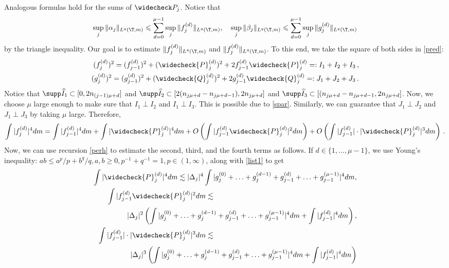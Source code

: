 \documentclass[twoside,a4paper]{amsart}
\def\ge{\geqslant}
\def\le{\leqslant}
\theoremstyle{remark}
\numberwithin{equation}{section}
\begin{document}
 Analogous formulas hold for the sums of $\widecheck P_j$. Notice that
 \begin{equation}\label{triangle}
 \sup_{j}\|\alpha_j\|_{L^q(\T,m)}\le \sum_{d=0}^{\mu-1}\sup_j\|f_j^{(d)}\|_{L^q(\T,m)}, \quad \sup_{j}\|\beta_j\|_{L^q(\T,m)}\le \sum_{d=0}^{\mu-1}\sup_j\|g_j^{(d)}\|_{L^q(\T,m)}
 \end{equation}
 by the triangle inequality. Our goal is to estimate $\|f_j^{(d)}\|_{L^4(\T,m)}$ and $\|f_j^{(d)}\|_{L^4(\T,m)}$.
To this end, we take the square of both sides in \eqref{pred}:
 \begin{eqnarray}\label{poy1}
 (f^{(d)}_j)^2=(f_{j-1}^{(d)})^2+(\widecheck{P}^{(d)}_j)^2+2f_{j-1}^{(d)}\widecheck{P}^{(d)}_j=:I_1+I_2+I_3\,,\\
 (g^{(d)}_j)^2=(g_{j-1}^{(d)})^2+(\widecheck{Q}^{(d)}_j)^2+2g_{j-1}^{(d)}\widecheck{Q}^{(d)}_j=:J_1+J_2+J_3\,.
 \end{eqnarray}
 Notice that $\supp \widehat I_1\subset [0,2n_{(j-1)\mu+d}]$ and $\supp \widehat I_2\subset [2(n_{j\mu+d}-n_{j\mu+d-1}),2n_{j\mu+d}]$ and $\supp \widehat I_3\subset [(n_{j\mu+d}-n_{j\mu+d-1},2n_{j\mu+d}] $.
 Now, we choose $\mu$ large enough to make sure that $I_1\perp I_2$ and $I_1\perp I_3$. This is possible due to \eqref{spar}. Similarly, we can guarantee that $J_1\perp J_2$ and $J_1\perp J_3$ by taking $\mu$ large.  Therefore, 
 \begin{equation}\label{cop1}
 \int |f^{(d)}_j|^4dm=\int |f_{j-1}^{(d)}|^4dm+\int |\widecheck{P}^{(d)}_j|^4dm +O\left(\int |f^{(d)}_{j-1}\widecheck{P}^{(d)}_j|^2dm\right)
 +O\left(\int |f^{(d)}_{j-1}|\cdot |\widecheck{P}^{(d)}_j|^3dm\right)\,.
 \end{equation}
 Now, we can use recursion \eqref{perh} to estimate the second, third, and the fourth terms as follows. If $d\in \{1,\ldots,\mu-1\}$, we use Young's inequality: $ab\le a^p/p+b^q/q, a,b\ge 0, p^{-1}+q^{-1}=1, p\in (1,\infty)$, along with \eqref{list1} to get
 \begin{eqnarray}
 \int |\widecheck{P}^{(d)}_j|^4dm\lesssim |\Delta_{j}|^4\int |g_j^{(0)}+\ldots+g^{(d-1)}_{j}+g_{j-1}^{(d)}+\ldots+g_{j-1}^{(\mu-1)}|^4dm, \\ \int |f^{(d)}_{j-1}\widecheck{P}^{(d)}_j|^2dm\lesssim \hspace{7cm}\\|\Delta_j|^2\left( \int |g_j^{(0)}+\ldots+g^{(d-1)}_{j}+g_{j-1}^{(d)}+\ldots+g_{j-1}^{(\mu-1)}|^4dm+ \int |f^{(d)}_{j-1}|^4dm\right),\\
 \int |f^{(d)}_{j-1}|\cdot |\widecheck{P}^{(d)}_j|^3dm\lesssim\hspace{7cm}  \\|\Delta_j|^3\left( \int | g_j^{(0)}+\ldots+g^{(d-1)}_{j}+g_{j-1}^{(d)}+\ldots+g_{j-1}^{(\mu-1)}  |^4dm+ \int |f^{(d)}_{j-1}|^4dm\right)
 \end{eqnarray}
\end{document}
